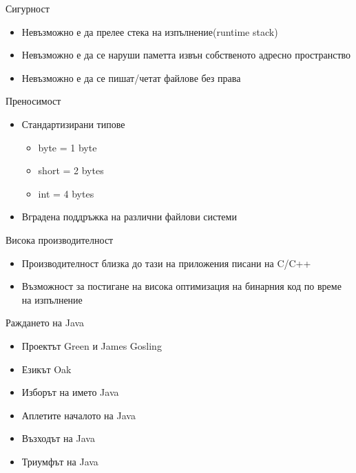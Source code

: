 \documentclass{beamer}
\begin{document}
\begin{frame}{Сигурност}
  \transdissolve  
  \begin{itemize}
   \item Невъзможно е да прелее стека на
    изпълнение(runtime stack)
   \item Невъзможно е да се наруши паметта
    извън собственото адресно
    пространство
   \item Невъзможно е да се пишат/четат
    файлове без права
  \end{itemize}
\end{frame}

\begin{frame}{Преносимост}
  \transdissolve
  \begin{itemize}
  \item Стандартизирани типове
    \begin{itemize}
      \item byte = 1 byte
      \item short = 2 bytes
      \item int = 4 bytes
    \end{itemize}
  \item Вградена поддръжка на различни
  файлови системи
  \end{itemize}
\end{frame}

\begin{frame}{Висока производителност}
  \transdissolve
  \begin{itemize}
  \item Производителност близка до тази на
  приложения писани на C/C++
  \item Възможност за постигане на висока
  оптимизация на бинарния код по време
  на изпълнение
\end{itemize}
\end{frame}

\begin{frame}{Раждането на Java}
  \transdissolve
  \begin{itemize}
    \item Проектът Green и James Gosling
    \item Езикът Oak
    \item Изборът на името Java
    \item Аплетите началото на Java
    \item Възходът на Java
    \item Триумфът на Java
  \end{itemize}
\end{frame}
\end{document}
